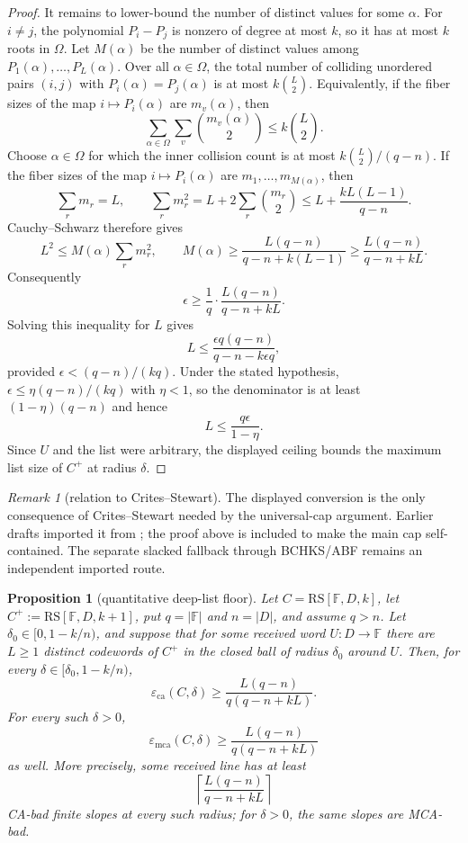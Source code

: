 \documentclass[11pt]{article}
\newtheorem{proposition}[theorem]{Proposition}
\theoremstyle{definition}
\theoremstyle{remark}
\newtheorem{remark}[theorem]{Remark}
\newcommand{\F}{\mathbb{F}}
\newcommand{\RS}{\mathrm{RS}}
\newcommand{\eca}{\varepsilon_{\mathrm{ca}}}
\newcommand{\emca}{\varepsilon_{\mathrm{mca}}}
\begin{document}
\begin{proof}
It remains to lower-bound the number of distinct values for some
$\alpha$.  For $i\ne j$, the polynomial $P_i-P_j$ is nonzero of degree
at most $k$, so it has at most $k$ roots in $\Omega$.  Let $M(\alpha)$
be the number of distinct values among $P_1(\alpha),\ldots,P_L(\alpha)$.
Over all $\alpha\in\Omega$, the total number of colliding unordered pairs
$(i,j)$ with $P_i(\alpha)=P_j(\alpha)$ is at most $k\binom L2$.
Equivalently, if the fiber sizes of the map $i\mapsto P_i(\alpha)$ are
$m_v(\alpha)$, then
\[
        \sum_{\alpha\in\Omega}\sum_v \binom{m_v(\alpha)}2
        \le k\binom L2 .
\]
Choose $\alpha\in\Omega$ for which the inner collision count is at most
$k\binom L2/(q-n)$.  If the fiber sizes of the map $i\mapsto P_i(\alpha)$ are
$m_1,\ldots,m_{M(\alpha)}$, then
\[
        \sum_r m_r=L,
        \qquad
        \sum_r m_r^2=L+2\sum_r\binom{m_r}{2}
        \le L+\frac{kL(L-1)}{q-n}.
\]
Cauchy--Schwarz therefore gives
\[
        L^2\le M(\alpha)\sum_r m_r^2,
        \qquad
        M(\alpha)\ge
        \frac{L(q-n)}{q-n+k(L-1)}
        \ge
        \frac{L(q-n)}{q-n+kL} .
\]
Consequently
\[
        \epsilon
        \ge
        \frac1q\cdot \frac{L(q-n)}{q-n+kL}.
\]
Solving this inequality for $L$ gives
\[
        L
        \le
        \frac{\epsilon q(q-n)}{q-n-k\epsilon q},
\]
provided $\epsilon<(q-n)/(kq)$.  Under the stated hypothesis,
$\epsilon\le\eta(q-n)/(kq)$ with $\eta<1$, so the denominator is at
least $(1-\eta)(q-n)$ and hence
\[
        L\le \frac{q\epsilon}{1-\eta}.
\]
Since $U$ and the list were arbitrary, the displayed ceiling bounds the
maximum list size of $C^+$ at radius $\delta$.
\end{proof}

\begin{remark}[relation to Crites--Stewart]
The displayed conversion is the only consequence of Crites--Stewart
needed by the universal-cap argument.  Earlier drafts imported it from
\cite[Thm.~2]{CS25}; the proof above is included to make the main cap
self-contained.  The separate slacked fallback through BCHKS/ABF remains
an independent imported route.
\end{remark}

\begin{proposition}[quantitative deep-list floor]
\label{prop:quantitative-deep-list-floor}
Let $C=\RS[\F,D,k]$, let $C^+:=\RS[\F,D,k+1]$, put
$q=|\F|$ and $n=|D|$, and assume $q>n$.  Let
$\delta_0\in[0,1-k/n)$, and suppose that for some received word
$U:D\to\F$ there are $L\ge1$ distinct codewords of $C^+$ in the
closed ball of radius $\delta_0$ around $U$.  Then, for every
$\delta\in[\delta_0,1-k/n)$,
\[
        \eca(C,\delta)
        \ge
        \frac{L(q-n)}{q(q-n+kL)} .
\]
For every such $\delta>0$,
\[
        \emca(C,\delta)
        \ge
        \frac{L(q-n)}{q(q-n+kL)}
\]
as well.  More precisely, some received line has at least
\[
        \left\lceil\frac{L(q-n)}{q-n+kL}\right\rceil
\]
CA-bad finite slopes at every such radius; for $\delta>0$, the same slopes are
MCA-bad.
\end{proposition}
\end{document}
